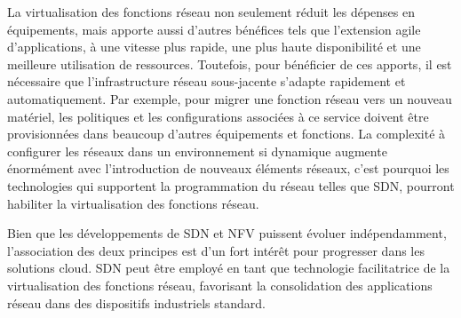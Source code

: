 


La virtualisation des fonctions réseau non seulement réduit les dépenses en équipements, mais apporte aussi d'autres bénéfices tels que l'extension agile d'applications, à une vitesse plus rapide, une plus haute disponibilité et une meilleure utilisation de ressources. Toutefois, pour bénéficier de ces apports, il est nécessaire que l'infrastructure réseau sous-jacente s'adapte rapidement et automatiquement. Par exemple, pour migrer une fonction réseau vers un nouveau matériel, les politiques et les configurations associées à ce service doivent être provisionnées dans beaucoup d'autres équipements et fonctions. La complexité à configurer les réseaux dans un environnement si dynamique augmente énormément avec l'introduction de nouveaux éléments réseaux, c'est pourquoi les technologies qui supportent la programmation du réseau telles que SDN, pourront habiliter la virtualisation des fonctions réseau.


Bien que les développements de SDN et NFV puissent évoluer indépendamment, l'association des deux principes est d'un fort intérêt pour progresser dans les solutions cloud. SDN peut être employé en tant que technologie facilitatrice de la virtualisation des fonctions réseau, favorisant la consolidation des applications réseau dans des dispositifs industriels standard. \cite{OFSDNNFVintro} \cite{realTimeCloudNFV} \cite{IntelCloudEPC}

